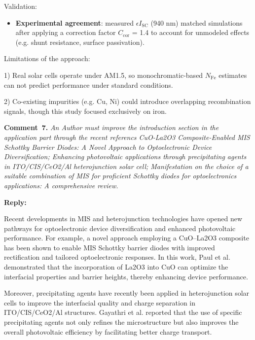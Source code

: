 \documentclass[a4paper,fleqn]{cas-sc}
\begin{document}
Validation:

\begin{itemize}
    \item \textbf{Experimental agreement}: measured $\epsilon I_\mathrm{SC}$ (940 nm) matched simulations after applying a correction factor $C_\mathrm{cor}$ = 1.4 to account for unmodeled effects (e.g. shunt resistance, surface passivation).
\end{itemize}

Limitations of the approach:

1) Real solar cells operate under AM1.5, so monochromatic-based $N_\mathrm{Fe}$ estimates can not predict performance under standard conditions.


2) Co-existing impurities (e.g. Cu, Ni) could introduce overlapping recombination signals, though this study focused exclusively on iron.


\vspace{1cm}
\noindent
\textcolor[rgb]{0.00,0.50,1.00}{\textbf{Comment~7.}}
\emph{An Author must improve the introduction section in the application part through the recent referencs
CuO-La2O3 Composite-Enabled MIS Schottky Barrier Diodes: A Novel Approach to Optoelectronic Device Diversification; Enhancing photovoltaic applications through precipitating agents in ITO/CIS/CeO2/Al heterojunction solar cell; Manifestation on the choice of a suitable combination of MIS for proficient Schottky diodes for optoelectronics applications: A comprehensive review.}

\noindent
\textcolor[rgb]{0.51,0.00,0.00}{\textbf{Reply:}}



Recent developments in MIS and heterojunction technologies have opened new pathways for optoelectronic device diversification and enhanced photovoltaic performance. For example, a novel approach employing a CuO–La2O3 composite has been shown to enable MIS Schottky barrier diodes with improved rectification and tailored optoelectronic responses. In this work, Paul et al. demonstrated that the incorporation of La2O3 into CuO can optimize the interfacial properties and barrier heights, thereby enhancing device performance.

Moreover, precipitating agents have recently been applied in heterojunction solar cells to improve the interfacial quality and charge separation in ITO/CIS/CeO2/Al structures. Gayathri et al. reported that the use of specific precipitating agents not only refines the microstructure but also improves the overall photovoltaic efficiency by facilitating better charge transport.  
\end{document}

